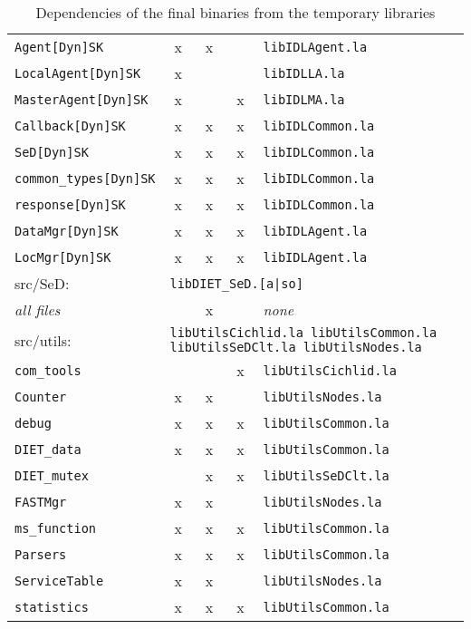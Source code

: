 \begin{table}[h]
\begin{tabular}[c]{|l|c|c|c|l|}
  \texttt{Agent[Dyn]SK}           & x & x &   & \texttt{libIDLAgent.la}\\
  \texttt{LocalAgent[Dyn]SK}      & x &   &   & \texttt{libIDLLA.la}\\
  \texttt{MasterAgent[Dyn]SK}     & x &   & x & \texttt{libIDLMA.la}\\
  \texttt{Callback[Dyn]SK}        & x & x & x & \texttt{libIDLCommon.la}\\
  \texttt{SeD[Dyn]SK}             & x & x & x & \texttt{libIDLCommon.la}\\
  \texttt{common\_types[Dyn]SK}   & x & x & x & \texttt{libIDLCommon.la}\\
  \texttt{response[Dyn]SK}        & x & x & x & \texttt{libIDLCommon.la}\\
  \texttt{DataMgr[Dyn]SK}        & x & x & x & \texttt{libIDLAgent.la}\\
  \texttt{LocMgr[Dyn]SK}        & x & x & x & \texttt{libIDLAgent.la}\\[5pt]
  \hline


  \multicolumn{1}{|l}{\textsf{src/SeD}:} &
  \multicolumn{4}{l|}{\texttt{libDIET\_SeD.[a|so]}}\\[5pt]

  \textit{all files}              &   & x &   & \emph{none}\\[5pt]
  \hline


  \multicolumn{1}{|l}{\textsf{src/utils}:} &
  \multicolumn{4}{l|}{\texttt{libUtilsCichlid.la libUtilsCommon.la 
                             libUtilsSeDClt.la  libUtilsNodes.la}}\\[5pt]

  \texttt{com\_tools}             &   &   & x & \texttt{libUtilsCichlid.la}\\
  \texttt{Counter}                & x & x &   & \texttt{libUtilsNodes.la}\\
  \texttt{debug}                  & x & x & x & \texttt{libUtilsCommon.la}\\
  \texttt{DIET\_data}             & x & x & x & \texttt{libUtilsCommon.la}\\
  \texttt{DIET\_mutex}            &   & x & x & \texttt{libUtilsSeDClt.la}\\
  \texttt{FASTMgr}                & x & x &   & \texttt{libUtilsNodes.la}\\
  \texttt{ms\_function}           & x & x & x & \texttt{libUtilsCommon.la}\\
  \texttt{Parsers}                & x & x & x & \texttt{libUtilsCommon.la}\\
  \texttt{ServiceTable}           & x & x &   & \texttt{libUtilsNodes.la}\\
  \texttt{statistics}             & x & x & x & \texttt{libUtilsCommon.la}\\[5pt]
  \hline
 

 \end{tabular}
 \caption{Dependencies of the final binaries from the temporary libraries}
 \label{t:dep}
\end{table}


